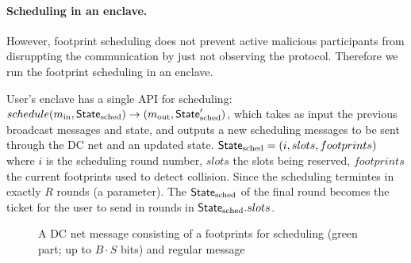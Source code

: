 
\paragraph{Scheduling in an enclave.} However, footprint scheduling does not prevent active malicious participants from disruppting the communication by just not observing the protocol. Therefore we run the footprint scheduling in an enclave.

User's enclave has a single API for scheduling: $schedule(m_\text{in}, \mathsf{State}_\text{sched}) \to (m_\text{out}, \mathsf{State}_\text{sched}')$, which takes as input the previous broadcast messages and state, and outputs a new scheduling messages to be sent through the DC net and an updated state. $\mathsf{State}_\text{sched}=(i, slots, footprints)$ where $i$ is the scheduling round number, $slots$ the slots being reserved, $footprints$ the current footprints used to detect collision. Since the scheduling termintes in exactly $R$ rounds (a parameter). The $\mathsf{State}_\text{sched}$ of the final round becomes the ticket for the user to send in rounds in $\mathsf{State}_\text{sched}.slots$.

\begin{figure}[H]
    \centering
    \caption{A DC net message consisting of a footprints for scheduling  (green part; up to $B\cdot S$ bits) and regular message}
    \label{fig:message}
\end{figure}

